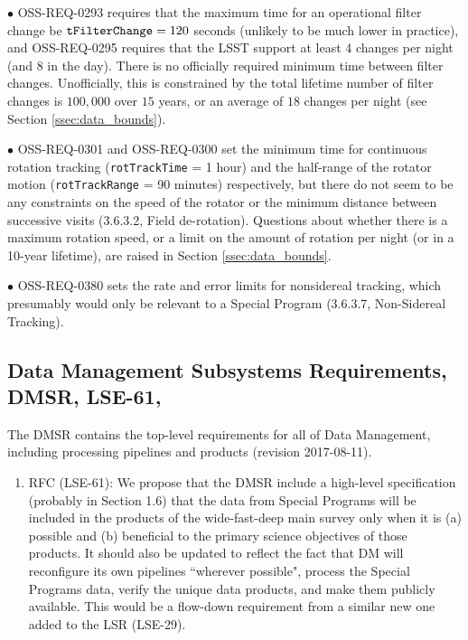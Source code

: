 \documentclass[DM,lsstdraft,toc]{lsstdoc}
\begin{document}
$\bullet$ OSS-REQ-0293 requires that the maximum time for an operational filter change be ${\tt tFilterChange} = 120$ seconds (unlikely to be much lower in practice), and OSS-REQ-0295 requires that the LSST support at least 4 changes per night (and 8 in the day). There is no officially required minimum time between filter changes. Unofficially, this is constrained by the total lifetime number of filter changes is $100,000$ over $15$ years, or an average of $18$ changes per night (see Section \ref{ssec:data_bounds}).

$\bullet$ OSS-REQ-0301 and OSS-REQ-0300 set the minimum time for continuous rotation tracking ({\tt rotTrackTime} = 1 hour) and the half-range of the rotator motion ({\tt rotTrackRange} = 90 minutes) respectively, but there do not seem to be any constraints on the speed of the rotator or the minimum distance between successive visits (3.6.3.2, Field de-rotation). Questions about whether there is a maximum rotation speed, or a limit on the amount of rotation per night (or in a 10-year lifetime), are raised in Section \ref{ssec:data_bounds}.

$\bullet$ OSS-REQ-0380 sets the rate and error limits for nonsidereal tracking, which presumably would only be relevant to a Special Program (3.6.3.7, Non-Sidereal Tracking).


\subsection{Data Management Subsystems Requirements, DMSR, LSE-61, \cite{LSE-61}}\label{ssec:docrev_dmsr}

The DMSR contains the top-level requirements for all of Data Management, including processing pipelines and products (revision 2017-08-11).

\begin{enumerate}[resume,topsep=-10pt,after=\vspace{10pt},label= \textbf{Action \Roman*}] \item \label{DMSR-0} RFC (LSE-61): We propose that the DMSR include a high-level specification (probably in Section 1.6) that the data from Special Programs will be included in the products of the wide-fast-deep main survey only when it is (a) possible and (b) beneficial to the primary science objectives of those products. It should also be updated to reflect the fact that DM will reconfigure its own pipelines ``wherever possible", process the Special Programs data, verify the unique data products, and make them publicly available. This would be a flow-down requirement from a similar new one added to the LSR (LSE-29).  \end{enumerate}
\end{document}
